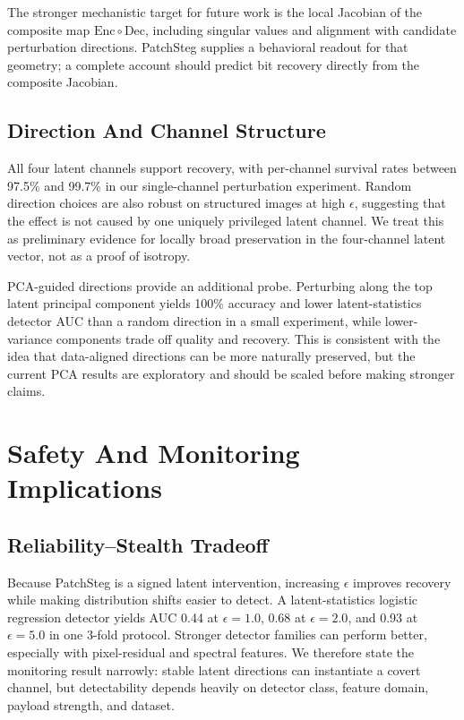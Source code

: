 \documentclass{article}
\begin{document}
The stronger mechanistic target for future work is the local Jacobian of the composite map $\mathrm{Enc}\circ\mathrm{Dec}$, including singular values and alignment with candidate perturbation directions. PatchSteg supplies a behavioral readout for that geometry; a complete account should predict bit recovery directly from the composite Jacobian.

\subsection{Direction And Channel Structure}

All four latent channels support recovery, with per-channel survival rates between 97.5\% and 99.7\% in our single-channel perturbation experiment. Random direction choices are also robust on structured images at high $\epsilon$, suggesting that the effect is not caused by one uniquely privileged latent channel. We treat this as preliminary evidence for locally broad preservation in the four-channel latent vector, not as a proof of isotropy.

PCA-guided directions provide an additional probe. Perturbing along the top latent principal component yields 100\% accuracy and lower latent-statistics detector AUC than a random direction in a small experiment, while lower-variance components trade off quality and recovery. This is consistent with the idea that data-aligned directions can be more naturally preserved, but the current PCA results are exploratory and should be scaled before making stronger claims.

\section{Safety And Monitoring Implications}

\subsection{Reliability--Stealth Tradeoff}

Because PatchSteg is a signed latent intervention, increasing $\epsilon$ improves recovery while making distribution shifts easier to detect. A latent-statistics logistic regression detector yields AUC 0.44 at $\epsilon=1.0$, 0.68 at $\epsilon=2.0$, and 0.93 at $\epsilon=5.0$ in one 3-fold protocol. Stronger detector families can perform better, especially with pixel-residual and spectral features. We therefore state the monitoring result narrowly: stable latent directions can instantiate a covert channel, but detectability depends heavily on detector class, feature domain, payload strength, and dataset.
\end{document}
